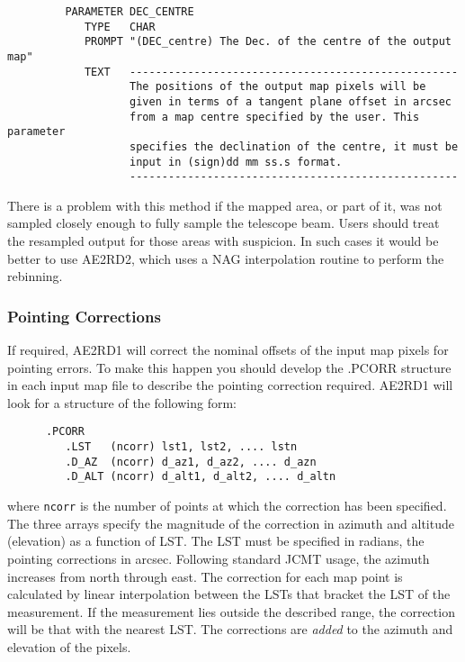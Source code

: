 \begin{small}
\begin{verbatim}
         PARAMETER DEC_CENTRE
            TYPE   CHAR
            PROMPT "(DEC_centre) The Dec. of the centre of the output map"
            TEXT   ---------------------------------------------------
                   The positions of the output map pixels will be 
                   given in terms of a tangent plane offset in arcsec 
                   from a map centre specified by the user. This parameter
                   specifies the declination of the centre, it must be 
                   input in (sign)dd mm ss.s format.
                   ---------------------------------------------------
\end{verbatim}
\end{small}

\goodbreak

There is a problem with this method if the mapped area, or part of it,
was not sampled closely enough to fully sample the telescope beam.
Users should treat the resampled output for those  areas with
suspicion. In such cases it would be better to use AE2RD2, which uses
a NAG interpolation routine to perform the rebinning.


\goodbreak

\subsubsection {Pointing Corrections}

If required, AE2RD1 will correct the nominal offsets of the  input map
pixels for pointing errors. To make this happen you should develop
the .PCORR structure in each input map file to describe the pointing
correction required. AE2RD1 will look for a structure of the following form:

\begin{small}
\begin{verbatim}
      .PCORR
         .LST   (ncorr) lst1, lst2, .... lstn
         .D_AZ  (ncorr) d_az1, d_az2, .... d_azn
         .D_ALT (ncorr) d_alt1, d_alt2, .... d_altn
\end{verbatim}
\end{small}

where \verb+ncorr+ is the number of points at which the correction has
been specified. The three arrays specify the magnitude of the correction
in azimuth and altitude (elevation) as a function of LST. The LST must be
specified in radians, the pointing corrections in arcsec. Following standard
JCMT usage, the azimuth increases from north through east. The
correction for each map point is calculated by linear interpolation
between the LSTs that bracket the LST of the measurement. If the
measurement lies outside the described  range, the correction will be
that with the nearest LST. The corrections are {\em added} to the azimuth
and elevation of the pixels.

